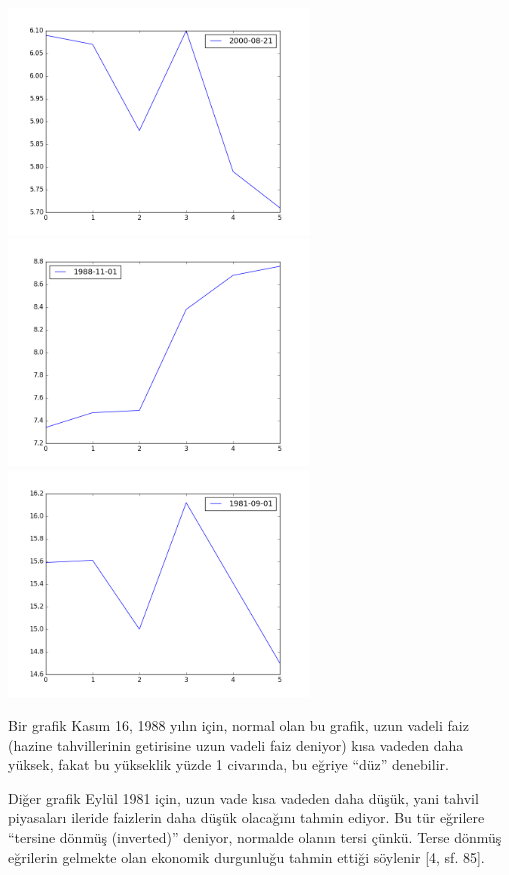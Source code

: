 \documentclass[12pt,fleqn]{article}\usepackage{../../common}
\begin{document}
\includegraphics[height=6cm]{tser_z001_05.png}
\includegraphics[height=6cm]{tser_z001_06.png}
\includegraphics[height=6cm]{tser_z001_07.png}

Bir grafik Kasım 16, 1988 yılın için, normal olan bu grafik, uzun vadeli faiz
(hazine tahvillerinin getirisine uzun vadeli faiz deniyor) kısa vadeden daha
yüksek, fakat bu yükseklik yüzde 1 civarında, bu eğriye ``düz'' denebilir.

Diğer grafik Eylül 1981 için, uzun vade kısa vadeden daha düşük, yani tahvil
piyasaları ileride faizlerin daha düşük olacağını tahmin ediyor.  Bu tür
eğrilere ``tersine dönmüş (inverted)'' deniyor, normalde olanın tersi
çünkü. Terse dönmüş eğrilerin gelmekte olan ekonomik durgunluğu tahmin ettiği
söylenir [4, sf. 85]. 

\newpage
\end{document}

